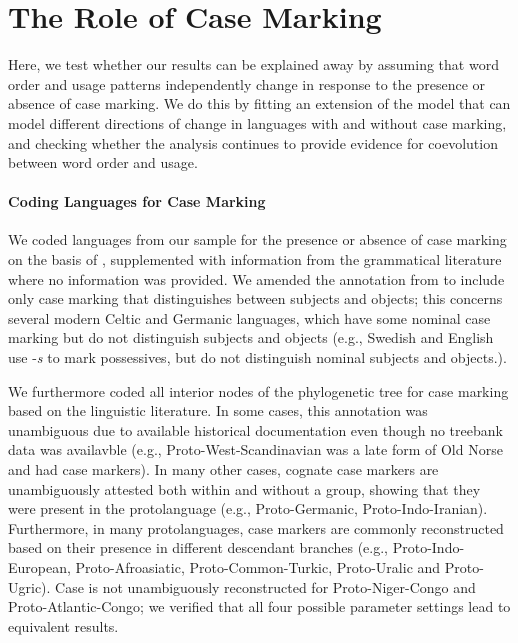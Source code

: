 \documentclass[11pt,a4paper]{article}
\begin{document}






\section{The Role of Case Marking}

Here, we test whether our results can be explained away by assuming that word order and usage patterns independently change in response to the presence or absence of case marking.
We do this by fitting an extension of the model that can model different directions of change in languages with and without case marking, and checking whether the analysis continues to provide evidence for coevolution between word order and usage.

\paragraph{Coding Languages for Case Marking}
We coded languages from our sample for the presence or absence of case marking on the basis of \citep{iggesen2013number}, supplemented with information from the grammatical literature where no information was provided.
We amended the annotation from \citep{iggesen2013number} to include only case marking that distinguishes between subjects and objects; this concerns several modern Celtic and Germanic languages, which have some nominal case marking but do not distinguish subjects and objects (e.g., Swedish and English use -\textit{s} to mark possessives, but do not distinguish nominal subjects and objects.).

We furthermore coded all interior nodes of the phylogenetic tree for case marking based on the linguistic literature.
In some cases, this annotation was unambiguous due to available historical documentation even though no treebank data was availavble (e.g., Proto-West-Scandinavian was a late form of Old Norse and had case markers).
In many other cases, cognate case markers are unambiguously attested both within and without a group, showing that they were present in the protolanguage (e.g., Proto-Germanic, Proto-Indo-Iranian).
Furthermore, in many protolanguages, case markers are commonly reconstructed based on their presence in different descendant branches (e.g., Proto-Indo-European, Proto-Afroasiatic, Proto-Common-Turkic, Proto-Uralic and Proto-Ugric). %
Case is not unambiguously reconstructed for Proto-Niger-Congo and Proto-Atlantic-Congo; we verified that all four possible parameter settings lead to equivalent results.
\end{document}
